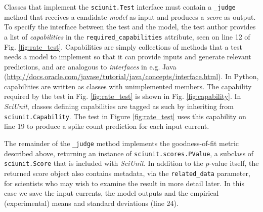\documentclass{frontiersSCNS}
\let\verbx\lstinline
\begin{document}
Classes that implement the \verbx{sciunit.Test} interface must contain a \verbx{_judge} method that receives a candidate \emph{model} as input and produces a \textit{score} as output. 
To specify the interface between the test and the model, the test author provides a list of \emph{capabilities} in the \verbx{required_capabilities} attribute, seen on line 12 of Fig. \ref{fig:rate_test}. 
Capabilities are simply collections of methods that a test needs a model to implement so that it can provide inputs and generate relevant predictions, and are analogous to \emph{interfaces} in e.g. Java (\url{http://docs.oracle.com/javase/tutorial/java/concepts/interface.html}). 
In Python, capabilities are written as classes with unimplemented members. 
The capability required by the test in Fig. \ref{fig:rate_test} is shown in Fig. \ref{fig:capability}. 
In \textit{SciUnit}, classes defining capabilities are tagged as such by inheriting from \verbx{sciunit.Capability}. 
The test in Figure \ref{fig:rate_test} uses this capability on line 19 to produce a spike count prediction for each input current. 

The remainder of the \verbx{_judge} method implements the goodness-of-fit metric described above, returning an instance of \verbx{sciunit.scores.PValue}, a subclass of \verbx{sciunit.Score} that is included with \textit{SciUnit}. 
In addition to the $p$-value itself, the returned score object also contains metadata, via the \verbx{related_data} parameter, for scientists who may wish to examine the result in more detail later. 
In this case we save the input currents, the model outputs and the empirical (experimental) means and standard deviations (line 24). 
\end{document}
